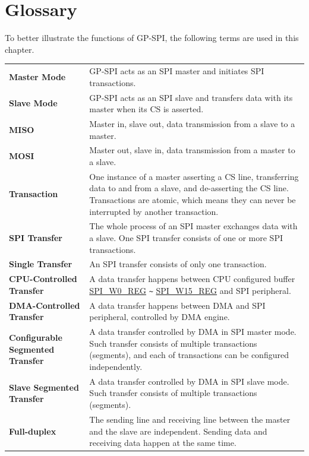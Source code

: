\section{Glossary}

To better illustrate the functions of GP-SPI, the following terms are used in this chapter. 

\begin{longtable}[c]{ R{7cm} p{10cm} }

\textbf{Master Mode}     & GP-SPI acts as an SPI master and initiates SPI transactions. \\ 
\textbf{Slave Mode}      & GP-SPI acts as an SPI slave and transfers data with its master when its CS is asserted.\\
\textbf{MISO}       & Master in, slave out, data transmission from a slave to a master.\\
\textbf{MOSI}  & Master out, slave in, data transmission from a master to a slave. \\ 
\textbf{Transaction} & One instance of a master asserting a CS line, transferring data to and from a slave, and de-asserting the CS line. Transactions are atomic, which means they can never be interrupted by another transaction.\\
\textbf{SPI Transfer} & The whole process of an SPI master exchanges data with a slave. One SPI transfer consists of one or more SPI transactions.\\
\textbf{Single Transfer} & An SPI transfer consists of only one transaction. \\
\textbf{CPU-Controlled Transfer}& A data transfer happens between CPU configured buffer \hyperref[regdesc:SPIW0REG]{SPI\_W0\_REG} \verb+~+ \hyperref[regdesc:SPIW15REG]{SPI\_W15\_REG} and SPI peripheral.\\
\textbf{DMA-Controlled Transfer}& A data transfer happens between DMA and SPI peripheral, controlled by DMA engine.\\
\textbf{Configurable Segmented Transfer}& A data transfer controlled by DMA in SPI master mode. Such transfer consists of multiple transactions (segments), and each of transactions can be configured independently.\\
\textbf{Slave Segmented Transfer} & A data transfer controlled by DMA in SPI slave mode. Such transfer consists of multiple transactions (segments).\\
\textbf{Full-duplex} & The sending line and receiving line between the master and the slave are independent. Sending data and receiving data happen at the same time. \\

\end{longtable}
